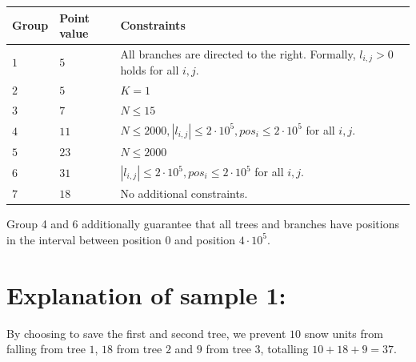 \noindent
\begin{tabular}{| l | l | p{12cm} |}
  \hline
  \textbf{Group} & \textbf{Point value} & \textbf{Constraints} \\ \hline
  $1$    & $5$        & All branches are directed to the right. Formally, $l_{i,j} > 0$ holds for all $i,j$.  \\ \hline
  $2$    & $5$        & $K = 1$ \\ \hline
  $3$    & $7$        & $N \leq 15$ \\ \hline
  $4$    & $11$       & $N \leq 2000, |l_{i,j}| \leq 2 \cdot 10^5, pos_i \leq 2 \cdot 10^5$ for all $i,j$. \\ \hline %
  $5$    & $23$       & $N \leq 2000$  \\ \hline
  $6$    & $31$       & $ |l_{i,j}| \leq 2 \cdot 10^5, pos_i \leq 2 \cdot 10^5$ for all $i,j$. \\ \hline
  $7$    & $18$       & No additional constraints. \\ \hline
\end{tabular}

Group 4 and 6 additionally guarantee that all trees and branches have positions in the interval between position $0$ and position $4 \cdot 10^5$.


\section*{Explanation of sample 1:}
By choosing to save the first and second tree, we prevent $10$ snow units from falling from tree $1$, $18$ from tree $2$ and $9$ from tree $3$,
totalling $10+18+9=37$.
